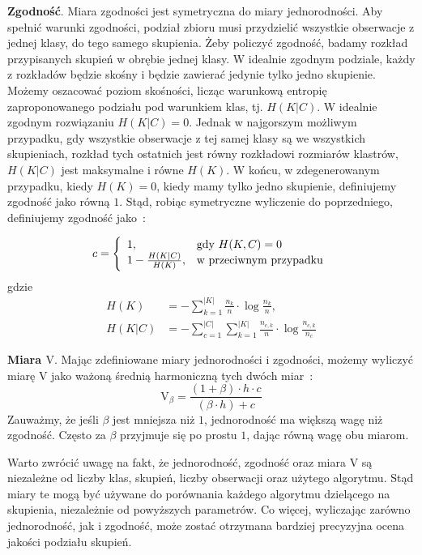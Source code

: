\documentclass{praca1}
\begin{document}
\textbf{Zgodność}. Miara zgodności jest symetryczna do miary jednorodności. Aby spełnić warunki zgodności, podział zbioru musi przydzielić wszystkie obserwacje z jednej klasy, do tego samego skupienia. Żeby policzyć zgodność, badamy rozkład przypisanych skupień w obrębie jednej klasy. W idealnie zgodnym podziale, każdy z rozkładów będzie skośny i będzie zawierać jedynie tylko jedno skupienie. Możemy oszacować poziom skośności, licząc warunkową entropię zaproponowanego podziału pod warunkiem klas, tj. $H(K|C)$. W idealnie zgodnym rozwiązaniu $H(K|C) = 0$. Jednak w najgorszym możliwym przypadku, gdy wszystkie obserwacje z tej samej klasy są we wszystkich skupieniach, rozkład tych ostatnich jest równy rozkładowi rozmiarów klastrów, $H(K|C)$ jest maksymalne i równe $H(K)$. W końcu, w zdegenerowanym przypadku, kiedy $H(K) = 0$, kiedy mamy tylko jedno skupienie, definiujemy zgodność jako równą $1$. Stąd, robiąc symetryczne wyliczenie do poprzedniego, definiujemy zgodność jako~\cite{Rosenberg2007:vmeasure}:

\begin{equation}
c = \left\{
\begin{array}{l l}     
1, & \text{gdy } H(K,C) = 0\\
1 - \frac{H(K|C)}{H(K)}, & \text{w przeciwnym przypadku}
\end{array}\right.
\end{equation}
gdzie
\begin{align*}
H(K) & = - \sum\limits_{k = 1}^{|K|}\frac{n_k}{n}\cdot \log{\frac{n_k}{n}},  \\
H(K|C) & = - \sum\limits_{c = 1}^{|C|}\sum\limits_{k = 1}^{|K|}\frac{n_{c,k}}{n}\cdot \log{\frac{n_{c,k}}{n_c}}
\end{align*}

\textbf{Miara $\textrm{V}$}. Mając zdefiniowane miary jednorodności i zgodności, możemy wyliczyć miarę $\textrm{V}$ jako ważoną średnią harmoniczną tych dwóch miar~\cite{Rosenberg2007:vmeasure}:
\begin{equation}
\textrm{V}_{\beta} = \frac{(1+\beta)\cdot h \cdot c}{(\beta \cdot h) + c}
\end{equation}
Zauważmy, że jeśli $\beta$ jest mniejsza niż $1$, jednorodność ma większą wagę niż zgodność. Często za $\beta$ przyjmuje się po prostu $1$, dając równą wagę obu miarom.

Warto zwrócić uwagę na fakt, że jednorodność, zgodność oraz miara V są niezależne od liczby klas, skupień, liczby obserwacji oraz użytego algorytmu. Stąd miary te mogą być używane do porównania każdego algorytmu dzielącego na skupienia, niezależnie od powyższych parametrów. Co więcej, wyliczając zarówno jednorodność, jak i zgodność, może zostać otrzymana bardziej precyzyjna ocena jakości podziału skupień.
\end{document}

